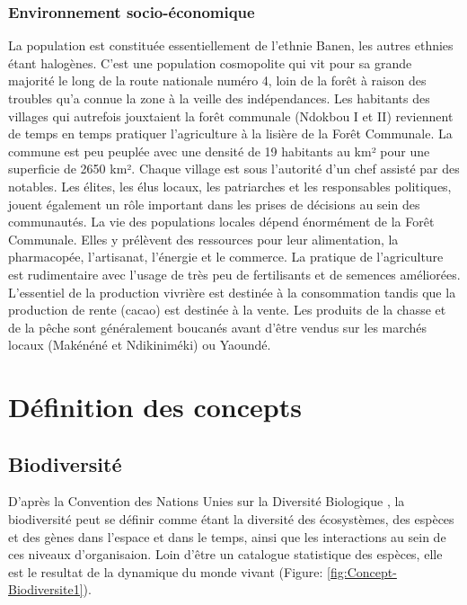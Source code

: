 \documentclass[
  12pt,
  a4paper,
  extrafontsizes,
  onecolumn,
  openright]{book}
\theoremstyle{definition}
\theoremstyle{definition}
\theoremstyle{definition}
\theoremstyle{definition}
\theoremstyle{remark}
\begin{document}
\hypertarget{environnement-socio-uxe9conomique-1}{%
\subsubsection{Environnement socio-économique}\label{environnement-socio-uxe9conomique-1}}

La population est constituée essentiellement de l'ethnie Banen, les autres ethnies étant halogènes. C'est une population cosmopolite qui vit pour sa grande majorité le long de la route nationale numéro 4, loin de la forêt à raison des troubles qu'a connue la zone à la veille des indépendances. Les habitants des villages qui autrefois jouxtaient la forêt communale (Ndokbou I et II) reviennent de temps en temps pratiquer l'agriculture à la lisière de la Forêt Communale. La commune est peu peuplée avec une densité de 19 habitants au km² pour une superficie de 2650 km². Chaque village est sous l'autorité d'un chef assisté par des notables. Les élites, les élus locaux, les patriarches et les responsables politiques, jouent également un rôle important dans les prises de décisions au sein des communautés. La vie des populations locales dépend énormément de la Forêt Communale. Elles y prélèvent des ressources pour leur alimentation, la pharmacopée, l'artisanat, l'énergie et le commerce. La pratique de l'agriculture est rudimentaire avec l'usage de très peu de fertilisants et de semences améliorées. L'essentiel de la production vivrière est destinée à la consommation tandis que la production de rente (cacao) est destinée à la vente. Les produits de la chasse et de la pêche sont généralement boucanés avant d'être vendus sur les marchés locaux (Makénéné et Ndikiniméki) ou Yaoundé.

\hypertarget{duxe9finition-des-concepts}{%
\section{Définition des concepts}\label{duxe9finition-des-concepts}}

\hypertarget{biodiversituxe9}{%
\subsection{Biodiversité}\label{biodiversituxe9}}

D'après la Convention des Nations Unies sur la Diversité Biologique , la biodiversité peut se définir comme étant la diversité des écosystèmes, des espèces et des gènes dans l'espace et dans le temps, ainsi que les interactions au sein de ces niveaux d'organisaion. Loin d'être un catalogue statistique des espèces, elle est le resultat de la dynamique du monde vivant (Figure: \ref{fig:Concept-Biodiversite1}).
\end{document}
